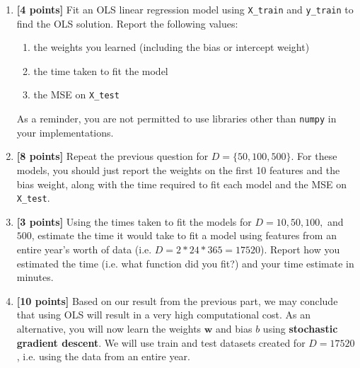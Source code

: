 \begin{enumerate}
    \item \textbf{[4 points]} Fit an OLS linear regression model using \texttt{X\_train} and \texttt{y\_train} to find the OLS solution. Report the following values:
    \begin{enumerate}
        \item the weights you learned (including the bias or intercept weight)
        \item the time taken to fit the model
        \item the MSE on \texttt{X\_test}
    \end{enumerate}
    As a reminder, you are not permitted to use libraries other than \texttt{numpy} in your implementations. 
    
    \begin{tcolorbox}[fit,height=5cm, width=0.95\textwidth, blank, borderline={1pt}{-2pt}]
    \end{tcolorbox}
    
    \item \textbf{[8 points]} Repeat the previous question for $D=\{50, 100, 500\}$. For these models, you should just report the weights on the first 10 features and the bias weight, along with the time required to fit each model and the MSE on \texttt{X\_test}.
    \begin{tcolorbox}[fit,height=7cm, width=0.95\textwidth, blank, borderline={1pt}{-2pt}]
    \end{tcolorbox}

    \clearpage
    
    \item \textbf{[3 points]} Using the times taken to fit the models for $D=10, 50, 100,$ and $500$, estimate the time it would take to fit a model using features from an entire year's worth of data (i.e. $D = 2 * 24 * 365 = 17520$). Report how you estimated the time (i.e. what function did you fit?) and your time estimate in minutes.
    \begin{tcolorbox}[fit,height=3cm, width=0.95\textwidth, blank, borderline={1pt}{-2pt}]
    \end{tcolorbox}

    \clearpage
    
    \item \textbf{[10 points]} Based on our result from the previous part, we may conclude that using OLS will result in a very high computational cost. As an alternative, you will now learn the weights $\mathbf{w}$ and bias $b$ using \textbf{stochastic gradient descent}. We will use train and test datasets created for $D=17520$, i.e. using the data from an entire year.
    

\end{enumerate}
